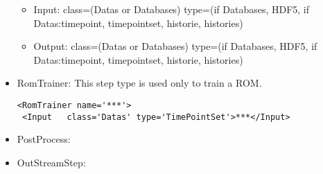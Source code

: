 \begin{itemize}
\begin{itemize}
\item Input: class=(Datas or Databases) type=(if Databases, HDF5, if Datas:timepoint, timepointset, historie, histories) 
\item Output: class=(Datas or Databases) type=(if Databases, HDF5, if Datas:timepoint, timepointset, historie, histories) 
\end{itemize}
\item RomTrainer: This step type is used only to train a ROM. 
\begin{lstlisting}[style=XML]
<RomTrainer name='***'>
 <Input   class='Datas' type='TimePointSet'>***</Input>
\end{lstlisting}
\item PostProcess:
\item OutStreamStep:
\end{itemize}











